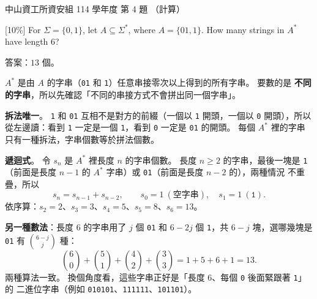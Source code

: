 \begin{pastexam}[label={px:nsysu-114-dmalg-03}]{中山資工所資安組 114 學年度 第 4 題}
（計算）

{[10\%]} For $\Sigma = \{0, 1\}$, let $A \subseteq \Sigma^*$, where $A = \{01, 1\}$. How many strings
in $A^*$ have length 6?
\end{pastexam}

\begin{pastsoln}
答案：$13$ 個。

$A^*$ 是由 $A$ 的字串（\texttt{01} 和 \texttt{1}）任意串接零次以上得到的所有字串。 要數的是
\textbf{不同的字串}，所以先確認「不同的串接方式不會拼出同一個字串」。

\textbf{拆法唯一}。 \texttt{1} 和 \texttt{01} 互相不是對方的前綴（一個以 \texttt{1} 開頭，一個以
\texttt{0} 開頭），所以從左邊讀：看到 \texttt{1} 一定是一個 \texttt{1}，看到 \texttt{0} 一定是
\texttt{01} 的開頭。 每個 $A^*$ 裡的字串只有一種拆法，字串個數等於拼法個數。

\textbf{遞迴式}。 令 $s_n$ 是 $A^*$ 裡長度 $n$ 的字串個數。 長度 $n \ge 2$ 的字串，最後一塊是
\texttt{1}（前面是長度 $n - 1$ 的 $A^*$ 字串）或 \texttt{01}（前面是長度 $n - 2$ 的），兩種情況
不重疊，所以
\[
s_n = s_{n-1} + s_{n-2}, \qquad s_0 = 1 \ (\text{空字串}),\quad s_1 = 1 \ (\texttt{1}).
\]
依序算：$s_2 = 2$、$s_3 = 3$、$s_4 = 5$、$s_5 = 8$、$s_6 = 13$。

\textbf{另一種數法}：長度 $6$ 的字串用了 $j$ 個 \texttt{01} 和 $6 - 2j$ 個 \texttt{1}，共
$6 - j$ 塊，選哪幾塊是 \texttt{01} 有 $\binom{6-j}{j}$ 種：
\[
\binom{6}{0} + \binom{5}{1} + \binom{4}{2} + \binom{3}{3} = 1 + 5 + 6 + 1 = 13 .
\]
兩種算法一致。 換個角度看，這些字串正好是「長度 $6$、每個 \texttt{0} 後面緊跟著 \texttt{1}」的
二進位字串（例如 \texttt{010101}、\texttt{111111}、\texttt{101101}）。
\end{pastsoln}
